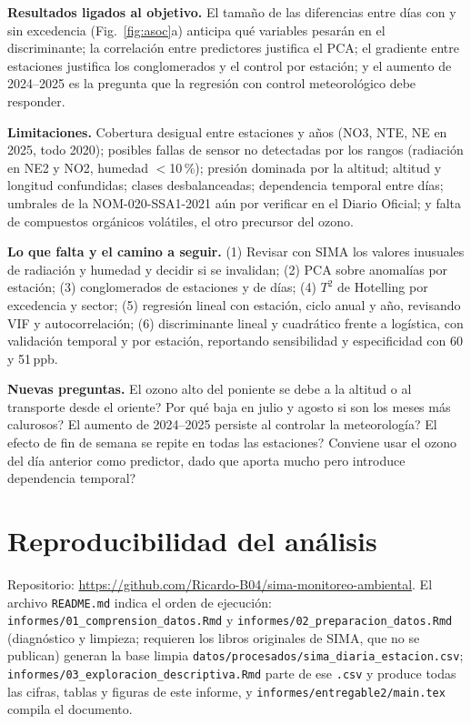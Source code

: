 \documentclass[11pt,letterpaper]{article}
\begin{document}
\textbf{Resultados ligados al objetivo.} El tama\~no de las diferencias entre d\'ias con y sin excedencia (Fig.~\ref{fig:asoc}a) anticipa qu\'e variables pesar\'an en el discriminante; la correlaci\'on entre predictores justifica el PCA; el gradiente entre estaciones justifica los conglomerados y el control por estaci\'on; y el aumento de 2024--2025 es la pregunta que la regresi\'on con control meteorol\'ogico debe responder.

\textbf{Limitaciones.} Cobertura desigual entre estaciones y a\~nos (NO3, NTE, NE en 2025, todo 2020); posibles fallas de sensor no detectadas por los rangos (radiaci\'on en NE2 y NO2, humedad $<$10\,\%); presi\'on dominada por la altitud; altitud y longitud confundidas; clases desbalanceadas; dependencia temporal entre d\'ias; umbrales de la NOM-020-SSA1-2021 a\'un por verificar en el Diario Oficial; y falta de compuestos org\'anicos vol\'atiles, el otro precursor del ozono.

\textbf{Lo que falta y el camino a seguir.} (1) Revisar con SIMA los valores inusuales de radiaci\'on y humedad y decidir si se invalidan; (2) PCA sobre anomal\'ias por estaci\'on; (3) conglomerados de estaciones y de d\'ias; (4) $T^2$ de Hotelling por excedencia y sector; (5) regresi\'on lineal con estaci\'on, ciclo anual y a\~no, revisando VIF y autocorrelaci\'on; (6) discriminante lineal y cuadr\'atico frente a log\'istica, con validaci\'on temporal y por estaci\'on, reportando sensibilidad y especificidad con 60 y 51\,ppb.

\textbf{Nuevas preguntas.} \textquestiondown El ozono alto del poniente se debe a la altitud o al transporte desde el oriente? \textquestiondown Por qu\'e baja en julio y agosto si son los meses m\'as calurosos? \textquestiondown El aumento de 2024--2025 persiste al controlar la meteorolog\'ia? \textquestiondown El efecto de fin de semana se repite en todas las estaciones? \textquestiondown Conviene usar el ozono del d\'ia anterior como predictor, dado que aporta mucho pero introduce dependencia temporal?

\section{Reproducibilidad del an\'alisis}
Repositorio: \url{https://github.com/Ricardo-B04/sima-monitoreo-ambiental}. El archivo \nolinkurl{README.md} indica el orden de ejecuci\'on: \nolinkurl{informes/01_comprension_datos.Rmd} y \nolinkurl{informes/02_preparacion_datos.Rmd} (diagn\'ostico y limpieza; requieren los libros originales de SIMA, que no se publican) generan la base limpia \nolinkurl{datos/procesados/sima_diaria_estacion.csv}; \nolinkurl{informes/03_exploracion_descriptiva.Rmd} parte de ese \texttt{.csv} y produce todas las cifras, tablas y figuras de este informe, y \nolinkurl{informes/entregable2/main.tex} compila el documento.
\end{document}
